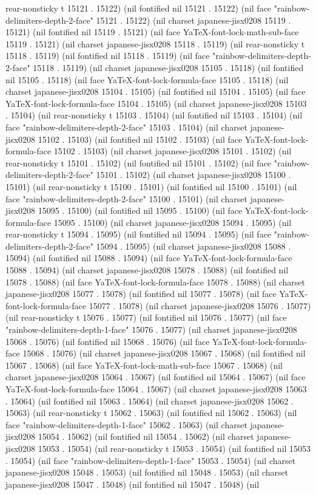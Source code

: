 rear-nonsticky t 15121 . 15122) (nil fontified nil 15121 . 15122) (nil face "rainbow-delimiters-depth-2-face" 15121 . 15122) (nil charset japanese-jisx0208 15119 . 15121) (nil fontified nil 15119 . 15121) (nil face YaTeX-font-lock-math-sub-face 15119 . 15121) (nil charset japanese-jisx0208 15118 . 15119) (nil rear-nonsticky t 15118 . 15119) (nil fontified nil 15118 . 15119) (nil face "rainbow-delimiters-depth-2-face" 15118 . 15119) (nil charset japanese-jisx0208 15105 . 15118) (nil fontified nil 15105 . 15118) (nil face YaTeX-font-lock-formula-face 15105 . 15118) (nil charset japanese-jisx0208 15104 . 15105) (nil fontified nil 15104 . 15105) (nil face YaTeX-font-lock-formula-face 15104 . 15105) (nil charset japanese-jisx0208 15103 . 15104) (nil rear-nonsticky t 15103 . 15104) (nil fontified nil 15103 . 15104) (nil face "rainbow-delimiters-depth-2-face" 15103 . 15104) (nil charset japanese-jisx0208 15102 . 15103) (nil fontified nil 15102 . 15103) (nil face YaTeX-font-lock-formula-face 15102 . 15103) (nil charset japanese-jisx0208 15101 . 15102) (nil rear-nonsticky t 15101 . 15102) (nil fontified nil 15101 . 15102) (nil face "rainbow-delimiters-depth-2-face" 15101 . 15102) (nil charset japanese-jisx0208 15100 . 15101) (nil rear-nonsticky t 15100 . 15101) (nil fontified nil 15100 . 15101) (nil face "rainbow-delimiters-depth-2-face" 15100 . 15101) (nil charset japanese-jisx0208 15095 . 15100) (nil fontified nil 15095 . 15100) (nil face YaTeX-font-lock-formula-face 15095 . 15100) (nil charset japanese-jisx0208 15094 . 15095) (nil rear-nonsticky t 15094 . 15095) (nil fontified nil 15094 . 15095) (nil face "rainbow-delimiters-depth-2-face" 15094 . 15095) (nil charset japanese-jisx0208 15088 . 15094) (nil fontified nil 15088 . 15094) (nil face YaTeX-font-lock-formula-face 15088 . 15094) (nil charset japanese-jisx0208 15078 . 15088) (nil fontified nil 15078 . 15088) (nil face YaTeX-font-lock-formula-face 15078 . 15088) (nil charset japanese-jisx0208 15077 . 15078) (nil fontified nil 15077 . 15078) (nil face YaTeX-font-lock-formula-face 15077 . 15078) (nil charset japanese-jisx0208 15076 . 15077) (nil rear-nonsticky t 15076 . 15077) (nil fontified nil 15076 . 15077) (nil face "rainbow-delimiters-depth-1-face" 15076 . 15077) (nil charset japanese-jisx0208 15068 . 15076) (nil fontified nil 15068 . 15076) (nil face YaTeX-font-lock-formula-face 15068 . 15076) (nil charset japanese-jisx0208 15067 . 15068) (nil fontified nil 15067 . 15068) (nil face YaTeX-font-lock-math-sub-face 15067 . 15068) (nil charset japanese-jisx0208 15064 . 15067) (nil fontified nil 15064 . 15067) (nil face YaTeX-font-lock-formula-face 15064 . 15067) (nil charset japanese-jisx0208 15063 . 15064) (nil fontified nil 15063 . 15064) (nil charset japanese-jisx0208 15062 . 15063) (nil rear-nonsticky t 15062 . 15063) (nil fontified nil 15062 . 15063) (nil face "rainbow-delimiters-depth-1-face" 15062 . 15063) (nil charset japanese-jisx0208 15054 . 15062) (nil fontified nil 15054 . 15062) (nil charset japanese-jisx0208 15053 . 15054) (nil rear-nonsticky t 15053 . 15054) (nil fontified nil 15053 . 15054) (nil face "rainbow-delimiters-depth-1-face" 15053 . 15054) (nil charset japanese-jisx0208 15048 . 15053) (nil fontified nil 15048 . 15053) (nil charset japanese-jisx0208 15047 . 15048) (nil fontified nil 15047 . 15048) (nil 